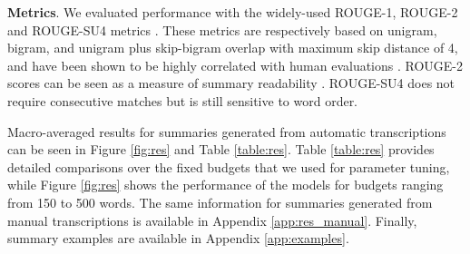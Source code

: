 \documentclass[11pt,a4paper]{article}
\begin{document}
\noindent\textbf{Metrics}.
We evaluated performance with the widely-used ROUGE-1, ROUGE-2 and ROUGE-SU4 metrics \cite{lin2004rouge}. These metrics are respectively based on unigram, bigram, and unigram plus skip-bigram overlap with maximum skip distance of 4, and have been shown to be highly correlated with human evaluations \cite{lin2004rouge}. ROUGE-2 scores can be seen as a measure of summary readability \cite{lin2003automatic,ganesan2010opinosis}. ROUGE-SU4 does not require consecutive matches but is still sensitive to word order.

Macro-averaged results for summaries generated from automatic transcriptions can be seen in Figure \ref{fig:res} and Table \ref{table:res}. Table \ref{table:res} provides detailed comparisons over the fixed budgets that we used for parameter tuning, while Figure \ref{fig:res} shows the performance of the models for budgets ranging from 150 to 500 words. The same information for summaries generated from manual transcriptions is available in Appendix \ref{app:res_manual}. Finally, summary examples are available in Appendix \ref{app:examples}.
\end{document}
